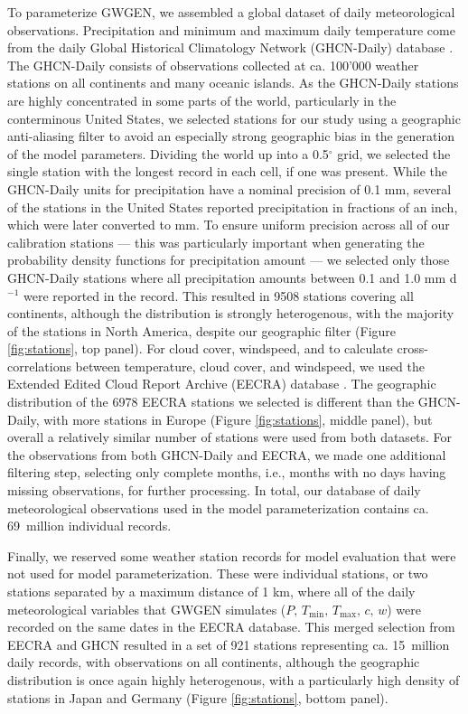 \documentclass[
11pt, %
english, %
singlespacing, %
headsepline, %
]{MastersDoctoralThesis} %
\begin{document}
\begin{NoHyper}
\begin{refsection}
To parameterize GWGEN, we assembled a global dataset of daily meteorological observations. Precipitation and minimum and maximum daily temperature come from the daily Global Historical Climatology Network (GHCN-Daily) database \citep{MenneDurreVoseEtAl2012,Menne2012}. The GHCN-Daily consists of observations collected at ca. 100'000 weather stations on all continents and many oceanic islands. As the GHCN-Daily stations are highly concentrated in some parts of the world, particularly in the conterminous United States, we selected stations for our study using a geographic anti-aliasing filter to avoid an especially strong geographic bias in the generation of the model parameters. Dividing the world up into a 0.5$^{\circ}$ grid, we selected the single station with the longest record in each cell, if one was present. While the GHCN-Daily units for precipitation have a nominal precision of 0.1 mm, several of the stations in the United States reported  precipitation in fractions of an inch, which were later converted to mm. To ensure uniform precision across all of our calibration stations --- this was particularly important when generating the probability density functions for precipitation amount --- we selected only those GHCN-Daily stations where all precipitation amounts between 0.1 and 1.0 mm d$^{-1}$ were reported in the record. This resulted in 9508 stations covering all continents, although the distribution is strongly heterogenous, with the majority of the stations in North America, despite our geographic filter (Figure \ref{fig:stations}, top panel). For cloud cover, windspeed, and to calculate cross-correlations between temperature, cloud cover, and windspeed, we used the Extended Edited Cloud Report Archive (EECRA) database \citep{HahnWarren1999}. The geographic distribution of the 6978 EECRA stations we selected is different than the GHCN-Daily, with more stations in Europe (Figure \ref{fig:stations}, middle panel), but overall a relatively similar number of stations were used from both datasets. For the observations from both GHCN-Daily and EECRA, we made one additional filtering step, selecting only complete months, i.e., months with no days having missing observations, for further processing. In total, our database of daily meteorological observations used in the model parameterization contains ca. 69~million individual records.

Finally, we reserved some weather station records for model evaluation that were not used for model parameterization. These were individual stations, or two stations separated by a maximum distance of 1 km, where all of the daily meteorological variables that GWGEN simulates ($P,\,T_\mathrm{min},\,T_\mathrm{max},\, c,\,w$) were recorded on the same dates in the EECRA database. This merged selection from EECRA and GHCN resulted in a set of 921 stations representing ca. 15~million daily records, with observations on all continents, although the geographic distribution is once again highly heterogenous, with a particularly high density of stations in Japan and Germany (Figure \ref{fig:stations}, bottom panel).



\end{refsection}
\end{NoHyper}
\end{document}
